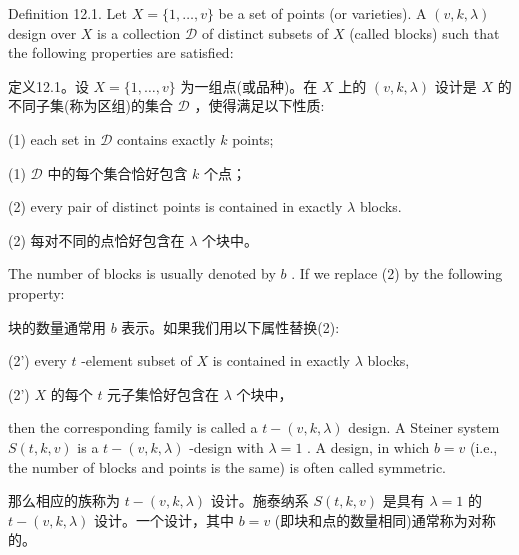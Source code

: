 \documentclass[10pt]{article}
\begin{document}
Definition 12.1. Let \(X = \{ 1,\ldots ,v\}\) be a set of points (or varieties). A \(\left( {v,k,\lambda }\right)\) design over \(X\) is a collection \(\mathcal{D}\) of distinct subsets of \(X\) (called blocks) such that the following properties are satisfied:

\begin{tcolorbox}\relax
定义12.1。设 \(X = \{ 1,\ldots ,v\}\) 为一组点(或品种)。在 \(X\) 上的 \(\left( {v,k,\lambda }\right)\) 设计是 \(X\) 的不同子集(称为区组)的集合 \(\mathcal{D}\) ，使得满足以下性质:
\end{tcolorbox}

(1) each set in \(\mathcal{D}\) contains exactly \(k\) points;

\begin{tcolorbox}\relax
(1) \(\mathcal{D}\) 中的每个集合恰好包含 \(k\) 个点；
\end{tcolorbox}

(2) every pair of distinct points is contained in exactly \(\lambda\) blocks.

\begin{tcolorbox}\relax
(2) 每对不同的点恰好包含在 \(\lambda\) 个块中。
\end{tcolorbox}

The number of blocks is usually denoted by \(b\) . If we replace (2) by the following property:

\begin{tcolorbox}\relax
块的数量通常用 \(b\) 表示。如果我们用以下属性替换(2):
\end{tcolorbox}

(2’) every \(t\) -element subset of \(X\) is contained in exactly \(\lambda\) blocks,

\begin{tcolorbox}\relax
(2’) \(X\) 的每个 \(t\) 元子集恰好包含在 \(\lambda\) 个块中，
\end{tcolorbox}

then the corresponding family is called a \(t - \left( {v,k,\lambda }\right)\) design. A Steiner system \(S\left( {t,k,v}\right)\) is a \(t - \left( {v,k,\lambda }\right)\) -design with \(\lambda  = 1\) . A design, in which \(b = v\) (i.e., the number of blocks and points is the same) is often called symmetric.

\begin{tcolorbox}\relax
那么相应的族称为 \(t - \left( {v,k,\lambda }\right)\) 设计。施泰纳系 \(S\left( {t,k,v}\right)\) 是具有 \(\lambda  = 1\) 的 \(t - \left( {v,k,\lambda }\right)\) 设计。一个设计，其中 \(b = v\) (即块和点的数量相同)通常称为对称的。
\end{tcolorbox}
\end{document}
